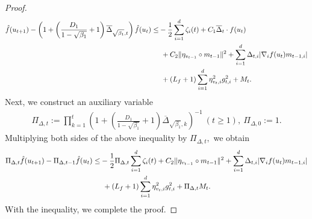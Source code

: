 \documentclass{article} %
\DeclareMathOperator{\Expect}{\mathbb{E}}
\begin{document}
\begin{proof}
\begin{align*}
\hat{f}(u_{t+1})-\left(1 + \left(\frac{D_1}{1 - \sqrt{\beta_{1}}} + 1\right) \overline{\Delta}_{\sqrt{\beta_{1}},t}\right)\hat{f}(u_{t})\le& -\frac{1}{2}\sum_{i=1}^{d}\zeta_{i}(t)+C_{1}\overline{\Delta}_{t}\cdot f(u_{t})\notag\\&\ +C_{2}\|{\eta_{v_{t-1}}}\circ m_{t-1}\|^{2}+\sum_{i=1}^{d}\Delta_{t,i}|\nabla_{i} f(u_{t})m_{t-1,i}|\\&\ +(L_{f}+1)\sum_{i=1}^{d}\eta_{v_{t},i}^{2}g_{t,i}^{2}+M_{t}.
\end{align*}
Next, we construct an auxiliary variable
\begin{align*}
\Pi_{\Delta,t}:=\prod_{k=1}^{t}\left(1+\left(\frac{D_1}{1-\sqrt{\beta_{1}}}+1\right)\overline{\Delta}_{\sqrt{\beta_{1}},k}\right)^{-1}\ (t\ge 1),\ \Pi_{\Delta,0}:=1.
\end{align*}
Multiplying both sides of the above inequality by $\Pi_{\Delta,t},$ we obtain
\begin{align*}
\Pi_{\Delta,t}\hat{f}(u_{t+1})-\Pi_{\Delta,t-1}\hat{f}(u_{t})\le &-\frac{1}{2}\Pi_{\Delta,t}\sum_{i=1}^{d}\zeta_{i}(t)\notag+C_{2}\|{\eta_{v_{t-1}}}\circ m_{t-1}\|^{2}+\sum_{i=1}^{d}\Delta_{t,i}|\nabla_{i} f(u_{t})m_{t-1,i}|\\&\ +(L_{f}+1)\sum_{i=1}^{d}\eta_{v_{t},i}^{2}g_{t,i}^{2}+\Pi_{\Delta,t}M_{t}.
\end{align*}
With the inequality, we complete the proof.
\end{proof}
\end{document}
